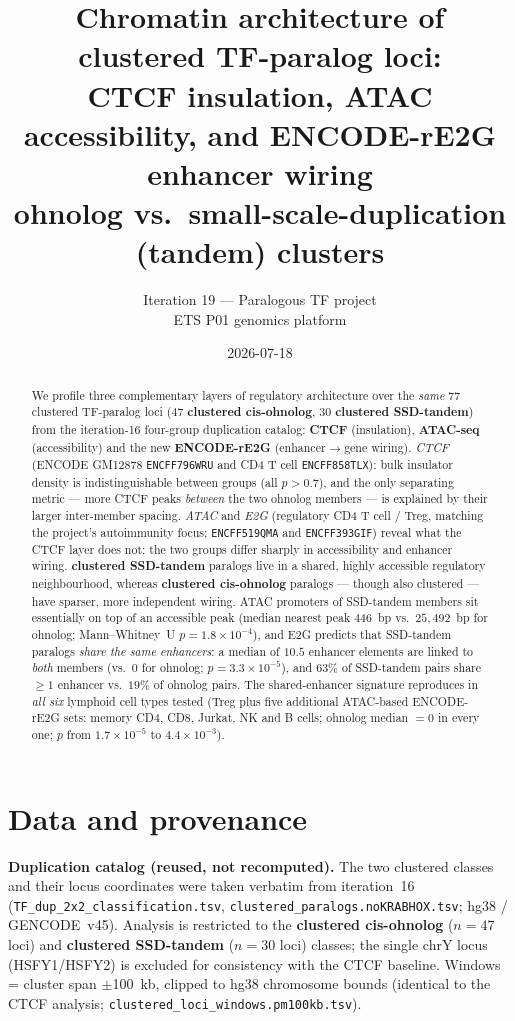 \documentclass[11pt]{article}
\title{\textbf{Chromatin architecture of clustered TF-paralog loci:\\
CTCF insulation, ATAC accessibility, and ENCODE-rE2G enhancer wiring}\\[2pt]
\large ohnolog vs.\ small-scale-duplication (tandem) clusters}
\author{Iteration 19 --- Paralogous TF project\\\small ETS P01 genomics platform}
\date{2026-07-18}
\newcommand{\ohno}{\textcolor{ohno}{\textbf{clustered cis-ohnolog}}}
\newcommand{\ssd}{\textcolor{ssd}{\textbf{clustered SSD-tandem}}}
\begin{document}
\maketitle

\begin{abstract}
\noindent We profile three complementary layers of regulatory architecture over the \emph{same}
77 clustered TF-paralog loci ($47$ \ohno{}, $30$ \ssd{}) from the iteration-16 four-group
duplication catalog: \textbf{CTCF} (insulation), \textbf{ATAC-seq} (accessibility) and the new
\textbf{ENCODE-rE2G} (enhancer$\rightarrow$gene wiring). \emph{CTCF} (ENCODE GM12878
\texttt{ENCFF796WRU} and CD4 T cell \texttt{ENCFF858TLX}): bulk insulator density is
indistinguishable between groups (all $p>0.7$), and the only separating metric --- more CTCF peaks
\emph{between} the two ohnolog members --- is explained by their larger inter-member spacing.
\emph{ATAC} and \emph{E2G} (regulatory CD4 T cell / Treg, matching the project's autoimmunity
focus; \texttt{ENCFF519QMA} and \texttt{ENCFF393GIF}) reveal what the CTCF layer does not: the two
groups differ sharply in accessibility and enhancer wiring. \ssd{} paralogs live in a shared,
highly accessible regulatory neighbourhood, whereas \ohno{} paralogs --- though also clustered ---
have sparser, more independent wiring. ATAC
promoters of SSD-tandem members sit essentially on top of an accessible peak (median nearest peak
$446$~bp vs.\ $25{,}492$~bp for ohnolog; Mann--Whitney~U $p=1.8\times10^{-4}$), and E2G predicts
that SSD-tandem paralogs \emph{share the same enhancers}: a median of $10.5$ enhancer elements are
linked to \emph{both} members (vs.\ $0$ for ohnolog; $p=3.3\times10^{-5}$), and $63\%$ of
SSD-tandem pairs share $\geq 1$ enhancer vs.\ $19\%$ of ohnolog pairs. The shared-enhancer
signature reproduces in \emph{all six} lymphoid cell types tested (Treg plus five additional
ATAC-based ENCODE-rE2G sets: memory CD4, CD8, Jurkat, NK and B cells; ohnolog median $=0$ in
every one; $p$ from $1.7\times10^{-5}$ to $4.4\times10^{-3}$).
\end{abstract}

\section{Data and provenance}
\textbf{Duplication catalog (reused, not recomputed).} The two clustered classes and their locus
coordinates were taken verbatim from iteration~16 (\texttt{TF\_dup\_2x2\_classification.tsv},
\texttt{clustered\_paralogs.noKRABHOX.tsv}; hg38 / GENCODE~v45). Analysis is restricted to the
\ohno{} ($n=47$ loci) and \ssd{} ($n=30$ loci) classes; the single chrY locus (HSFY1/HSFY2) is
excluded for consistency with the CTCF baseline. Windows = cluster span $\pm$100~kb, clipped to
hg38 chromosome bounds (identical to the CTCF analysis; \texttt{clustered\_loci\_windows.pm100kb.tsv}).
\end{document}
